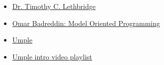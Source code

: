 \clearpage{}\label{mops}\secdown
\secup

\begin{itemize}[nosep]

\item
\href{http://www.site.uottawa.ca/~tcl/}{Dr. Timothy C. Lethbridge}

\item
\href{https://badreddin.com/research/model-oriented-programming/}{Omar
Badreddin: Model Oriented Programming}

\item \href{http://cruise.site.uottawa.ca/umple/}{Umple}
\item \href{https://www.youtube.com/playlist?list=PLA6E9B1AE9E2D6677}{Umple
intro video playlist}

\end{itemize}
